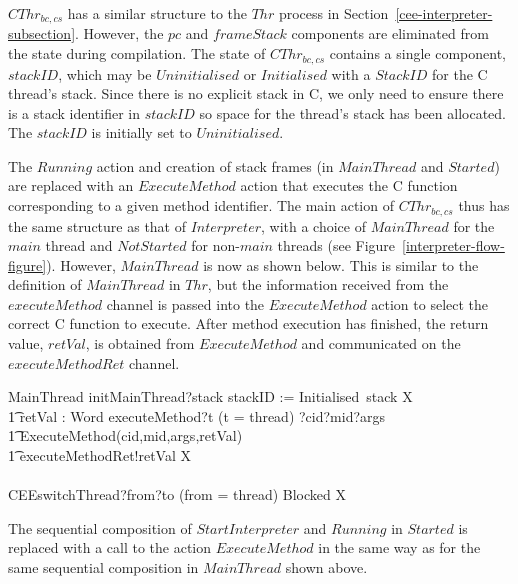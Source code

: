 $CThr_{bc,cs}$ has a similar structure to the $Thr$ process in
Section~\ref{cee-interpreter-subsection}.
However, the $pc$ and $frameStack$ components are eliminated from the
state during compilation.
The state of $CThr_{bc,cs}$ contains a single component, $stackID$,
which may be $Uninitialised$ or $Initialised$ with a $StackID$ for the
C thread's stack.
Since there is no explicit stack in C, we only need to ensure there is
a stack identifier in $stackID$ so space for the thread's stack has
been allocated.
The $stackID$ is initially set to $Uninitialised$.

The $Running$ action and creation of stack frames (in $MainThread$ and
$Started$) are replaced with an $ExecuteMethod$ action that
executes the C function corresponding to a given method identifier.
The main action of $CThr_{bc,cs}$ thus has the same structure as that
of $Interpreter$, with a choice of $MainThread$ for the $main$ thread
and $NotStarted$ for non-$main$ threads (see
Figure~\ref{interpreter-flow-figure}).
However, $MainThread$ is now as shown below.
This is similar to the definition of $MainThread$ in $Thr$, but the
information received from the $executeMethod$ channel is passed into
the $ExecuteMethod$ action to select the correct C function to
execute.
After method execution has finished, the return value, $retVal$, is
obtained from $ExecuteMethod$ and communicated on the
$executeMethodRet$ channel.
\begin{circusaction}
  MainThread \circdef initMainThread?stack \then stackID := Initialised~stack \circseq \circmu X \circspot \\
  \t1 \circblockbegin
  \circvar retVal : Word \circspot executeMethod?t \prefixcolon (t = thread) ?cid?mid?args \then {} \\
  \t1 ExecuteMethod(cid,mid,args,retVal) \circseq \\
  \t1 executeMethodRet!retVal \then X \\
  {} \extchoice {} \\
  CEEswitchThread?from?to \prefixcolon (from = thread) \then Blocked
  \circseq X \circblockend
\end{circusaction}
The sequential composition of $StartInterpreter$ and $Running$ in
$Started$ is replaced with a call to the action $ExecuteMethod$ in the
same way as for the same sequential composition in $MainThread$ shown
above.

